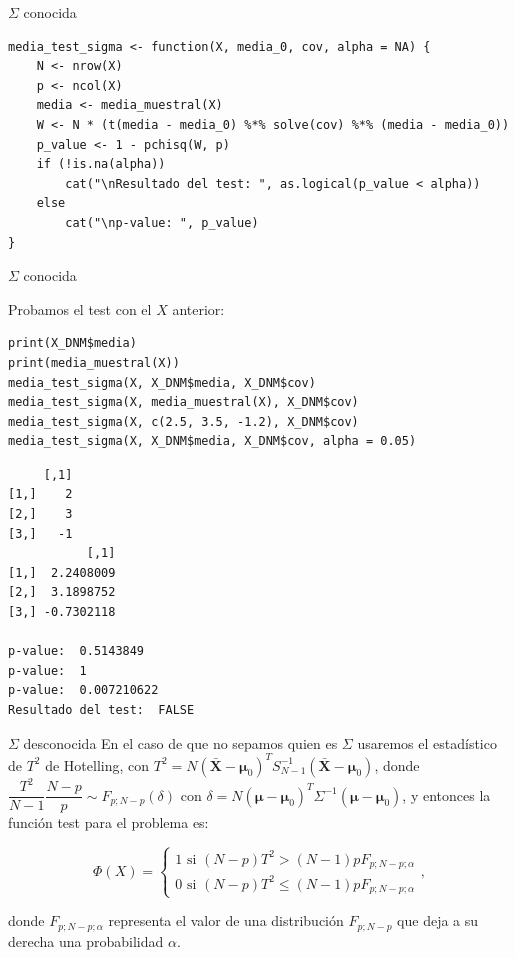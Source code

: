 \documentclass[xcolor=table]{beamer}
\begin{document}
\begin{frame}[fragile]{$\Sigma$ conocida}
\begin{lstlisting}
media_test_sigma <- function(X, media_0, cov, alpha = NA) {
    N <- nrow(X)
    p <- ncol(X)
    media <- media_muestral(X)
    W <- N * (t(media - media_0) %*% solve(cov) %*% (media - media_0))
    p_value <- 1 - pchisq(W, p)
    if (!is.na(alpha))
        cat("\nResultado del test: ", as.logical(p_value < alpha))
    else
        cat("\np-value: ", p_value)
}
\end{lstlisting}
\end{frame}

\begin{frame}[fragile]{$\Sigma$ conocida}

Probamos el test con el $X$ anterior:

\begin{lstlisting}
print(X_DNM$media)
print(media_muestral(X))
media_test_sigma(X, X_DNM$media, X_DNM$cov)
media_test_sigma(X, media_muestral(X), X_DNM$cov)
media_test_sigma(X, c(2.5, 3.5, -1.2), X_DNM$cov)
media_test_sigma(X, X_DNM$media, X_DNM$cov, alpha = 0.05)
\end{lstlisting}

\begin{lstlisting}
     [,1]
[1,]    2
[2,]    3
[3,]   -1
           [,1]
[1,]  2.2408009
[2,]  3.1898752
[3,] -0.7302118

p-value:  0.5143849
p-value:  1
p-value:  0.007210622
Resultado del test:  FALSE
\end{lstlisting}


\end{frame}


\begin{frame}[fragile]{$\Sigma$ desconocida}
En el caso de que no sepamos quien es $\Sigma$ usaremos el estadístico de $T^2$ de Hotelling, con $T^2 = N (\pmb{\bar{X}} - \pmb{\mu}_0)^T S_{N-1}^{-1} (\pmb{\bar{X}} - \pmb{\mu}_0)$, donde $\dfrac{T^2}{N-1} \dfrac{N-p}{p} \sim F_{p;N-p}(\delta)$ con $\delta = N (\pmb{\mu} - \pmb{\mu}_0)^T \Sigma^{-1} (\pmb{\mu} - \pmb{\mu}_0)$, y entonces la función test para el problema es:

$$ \Phi(X) = \begin{cases} 1 \text{ si } (N-p)T^2 > (N-1)pF_{p;N-p;\alpha} \\ 0 \text{ si } (N-p)T^2 \leq (N-1)pF_{p;N-p;\alpha} \end{cases}, $$

donde $F_{p;N-p;\alpha}$ representa el valor de una distribución $F_{p;N-p}$ que deja a su derecha una probabilidad $\alpha$.
\end{frame}
\end{document}

